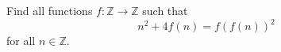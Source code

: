 Find all functions $f : \mathbb{Z} \to \mathbb{Z}$ such that
\[ n^2 + 4f(n) = f(f(n))^2 \]
for all $n \in \mathbb{Z}$.

